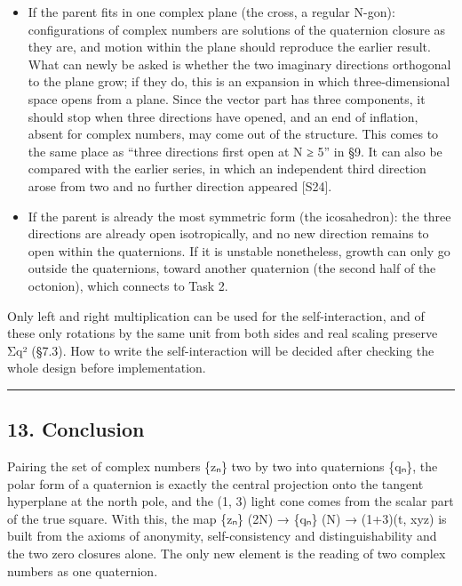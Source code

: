 \documentclass[
  a4paper,
]{article}
\newcounter{none} %
\providecommand{\tightlist}{%
  \setlength{\itemsep}{0pt}\setlength{\parskip}{0pt}}
\begin{document}
\begin{itemize}
\tightlist
\item
  If the parent fits in one complex plane (the cross, a regular N-gon):
  configurations of complex numbers are solutions of the quaternion
  closure as they are, and motion within the plane should reproduce the
  earlier result. What can newly be asked is whether the two imaginary
  directions orthogonal to the plane grow; if they do, this is an
  expansion in which three-dimensional space opens from a plane. Since
  the vector part has three components, it should stop when three
  directions have opened, and an end of inflation, absent for complex
  numbers, may come out of the structure. This comes to the same place
  as ``three directions first open at N ≥ 5'' in §9. It can also be
  compared with the earlier series, in which an independent third
  direction arose from two and no further direction appeared {[}S24{]}.
\item
  If the parent is already the most symmetric form (the icosahedron):
  the three directions are already open isotropically, and no new
  direction remains to open within the quaternions. If it is unstable
  nonetheless, growth can only go outside the quaternions, toward
  another quaternion (the second half of the octonion), which connects
  to Task 2.
\end{itemize}

Only left and right multiplication can be used for the self-interaction,
and of these only rotations by the same unit from both sides and real
scaling preserve Σq² (§7.3). How to write the self-interaction will be
decided after checking the whole design before implementation.

\begin{center}\rule{0.5\linewidth}{0.5pt}\end{center}

\subsection{13. Conclusion}\label{conclusion}

Pairing the set of complex numbers \{zₙ\} two by two into quaternions
\{qₙ\}, the polar form of a quaternion is exactly the central projection
onto the tangent hyperplane at the north pole, and the (1, 3) light cone
comes from the scalar part of the true square. With this, the map \{zₙ\}
(2N) → \{qₙ\} (N) → (1+3)(t, xyz) is built from the axioms of anonymity,
self-consistency and distinguishability and the two zero closures alone.
The only new element is the reading of two complex numbers as one
quaternion.
\end{document}
